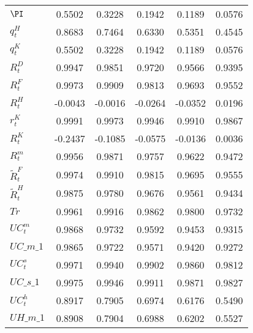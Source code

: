 \begin{center}
\begin{longtable}{lccccc}
$ \PI                       $	 & 	    0.5502	 & 	    0.3228	 & 	    0.1942	 & 	    0.1189	 & 	    0.0576 \\ 
$ q^H_t                     $	 & 	    0.8683	 & 	    0.7464	 & 	    0.6330	 & 	    0.5351	 & 	    0.4545 \\ 
$  q^K_t                    $	 & 	    0.5502	 & 	    0.3228	 & 	    0.1942	 & 	    0.1189	 & 	    0.0576 \\ 
$  R^D_t                    $	 & 	    0.9947	 & 	    0.9851	 & 	    0.9720	 & 	    0.9566	 & 	    0.9395 \\ 
$ R^F_t                     $	 & 	    0.9973	 & 	    0.9909	 & 	    0.9813	 & 	    0.9693	 & 	    0.9552 \\ 
$   R^H_t                   $	 & 	   -0.0043	 & 	   -0.0016	 & 	   -0.0264	 & 	   -0.0352	 & 	    0.0196 \\ 
$ r^K_t                     $	 & 	    0.9991	 & 	    0.9973	 & 	    0.9946	 & 	    0.9910	 & 	    0.9867 \\ 
$  R^K_t                    $	 & 	   -0.2437	 & 	   -0.1085	 & 	   -0.0575	 & 	   -0.0136	 & 	    0.0036 \\ 
$  R^m_t                    $	 & 	    0.9956	 & 	    0.9871	 & 	    0.9757	 & 	    0.9622	 & 	    0.9472 \\ 
$  \tilde{R}^F_t            $	 & 	    0.9974	 & 	    0.9910	 & 	    0.9815	 & 	    0.9695	 & 	    0.9555 \\ 
$  \tilde{R}^H_t            $	 & 	    0.9875	 & 	    0.9780	 & 	    0.9676	 & 	    0.9561	 & 	    0.9434 \\ 
$ Tr                        $	 & 	    0.9961	 & 	    0.9916	 & 	    0.9862	 & 	    0.9800	 & 	    0.9732 \\ 
$ UC^m_t                    $	 & 	    0.9868	 & 	    0.9732	 & 	    0.9592	 & 	    0.9453	 & 	    0.9315 \\ 
$UC\_m\_1                   $	 & 	    0.9865	 & 	    0.9722	 & 	    0.9571	 & 	    0.9420	 & 	    0.9272 \\ 
$ UC^s_t                    $	 & 	    0.9971	 & 	    0.9940	 & 	    0.9902	 & 	    0.9860	 & 	    0.9812 \\ 
$UC\_s\_1                   $	 & 	    0.9975	 & 	    0.9946	 & 	    0.9911	 & 	    0.9871	 & 	    0.9827 \\ 
$ UC^h_t                    $	 & 	    0.8917	 & 	    0.7905	 & 	    0.6974	 & 	    0.6176	 & 	    0.5490 \\ 
$UH\_m\_1                   $	 & 	    0.8908	 & 	    0.7904	 & 	    0.6988	 & 	    0.6202	 & 	    0.5527 \\ 

\end{longtable}
\end{center}
